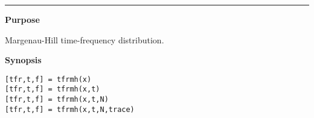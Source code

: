 

\hspace*{-1.6cm}{\Large \bf tfrmh}

\vspace*{-.4cm}
\hspace*{-1.6cm}\rule[0in]{16.5cm}{.02cm}
\vspace*{.2cm}

{\bf \large {}\selectfont Purpose}\\
\hspace*{1.5cm}
\begin{minipage}[t]{13.5cm}
Margenau-Hill time-frequency distribution.
\end{minipage}
\vspace*{.2cm}

{\bf \large {}\selectfont Synopsis}\\
\hspace*{1.5cm}
\begin{minipage}[t]{13.5cm}
\begin{verbatim}
[tfr,t,f] = tfrmh(x)
[tfr,t,f] = tfrmh(x,t)
[tfr,t,f] = tfrmh(x,t,N)
[tfr,t,f] = tfrmh(x,t,N,trace)
\end{verbatim}
\end{minipage}
\vspace*{.3cm}

